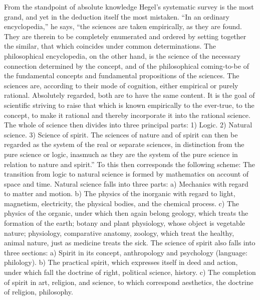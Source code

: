 \documentclass[12pt]{book}
\begin{document}
From the standpoint of absolute knowledge Hegel's systematic survey is the most
grand, and yet in the deduction itself the most mistaken. ``In an ordinary
encyclopedia,'' he says, ``the sciences are taken empirically, as they are found.
They are therein to be completely enumerated and ordered by setting together the
similar, that which coincides under common determinations. The philosophical
encyclopedia, on the other hand, is the science of the necessary connection
determined by the concept, and of the philosophical coming-to-be of the
fundamental concepts and fundamental propositions of the sciences. The sciences
are, according to their mode of cognition, either empirical or purely rational.
Absolutely regarded, both are to have the same content. It is the goal of
scientific striving to raise that which is known empirically to the ever-true,
to the concept, to make it rational and thereby incorporate it into the rational
science. The whole of science then divides into three principal parts: 1) Logic.
2) Natural science. 3) Science of spirit. The sciences of nature and of spirit
can then be regarded as the system of the real or separate sciences, in
distinction from the pure science or logic, inasmuch as they are the system of
the pure science in relation to nature and spirit.'' To this then corresponds the
following scheme: The transition from logic to natural science is formed by
mathematics on account of space and time. Natural science falls into three
parts: a) Mechanics with regard to matter and motion. b) The physics of the
inorganic with regard to light, magnetism, electricity, the physical bodies, and
the chemical process. c) The physics of the organic, under which then again
belong geology, which treats the formation of the earth; botany and plant
physiology, whose object is vegetable nature; physiology, comparative anatomy,
zoology, which treat the healthy, animal nature, just as medicine treats the
sick. The science of spirit also falls into three sections: a) Spirit in its
concept, anthropology and psychology (language: philology). b) The practical
spirit, which expresses itself in deed and action, under which fall the doctrine
of right, political science, history. c) The completion of spirit in art,
religion, and science, to which correspond aesthetics, the doctrine of religion,
philosophy.
\end{document}
